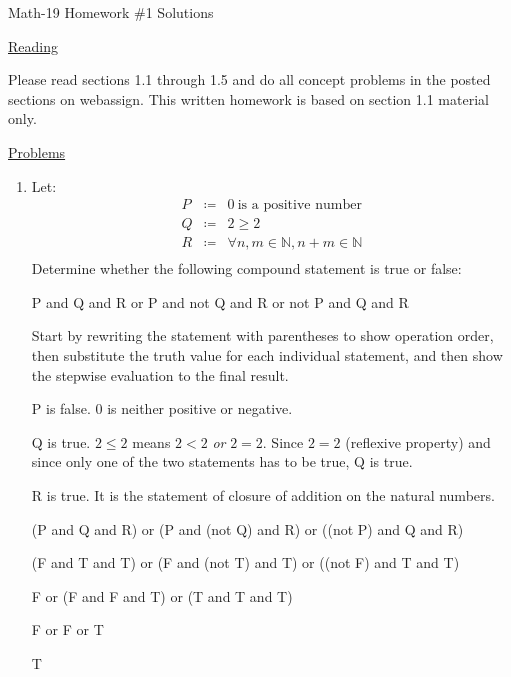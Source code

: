 \documentclass[letterpaper,12pt,fleqn]{article}
\begin{document}
\begin{center}
\Large Math-19 Homework \#1 Solutions
\end{center}

\vspace{0.5in}

\underline{Reading}

Please read sections 1.1 through 1.5 and do all concept problems in the posted
sections on web\-assign. This written homework is based on section 1.1 material
only.

\underline{Problems}

\begin{enumerate}
\item Let:
\begin{eqnarray*}
P &\coloneqq& 0\ \mbox{is a positive number} \\
Q &\coloneqq& 2\ge2 \\
R &\coloneqq& \forall n,m\in\mathbb{N}, n+m\in\mathbb{N} \\
\end{eqnarray*}
Determine whether the following compound statement is true or false:

\hspace{0.5in}P and Q and R or P and not Q and R or not P and Q and R

Start by rewriting the statement with parentheses to show operation order,
then substitute the truth value for each individual statement, and then
show the stepwise evaluation to the final result.

\bigskip

P is false. 0 is neither positive or negative.

Q is true. $2\le2$ means $2<2$ \emph{or} $2=2$. Since $2=2$ (reflexive
property) and since only one of the two statements has to be true, Q is true.

R is true. It is the statement of closure of addition on the natural numbers.

\hspace{0.5in}(P and Q and R) or (P and (not Q) and R) or ((not P) and Q and R)

\hspace{0.5in}(F and T and T) or (F and (not T) and T) or ((not F) and T and T)

\hspace{0.5in}F or (F and F and T) or (T and T and T)

\hspace{0.5in}F or F or T

\hspace{0.5in}T


\end{enumerate}
\end{document}
